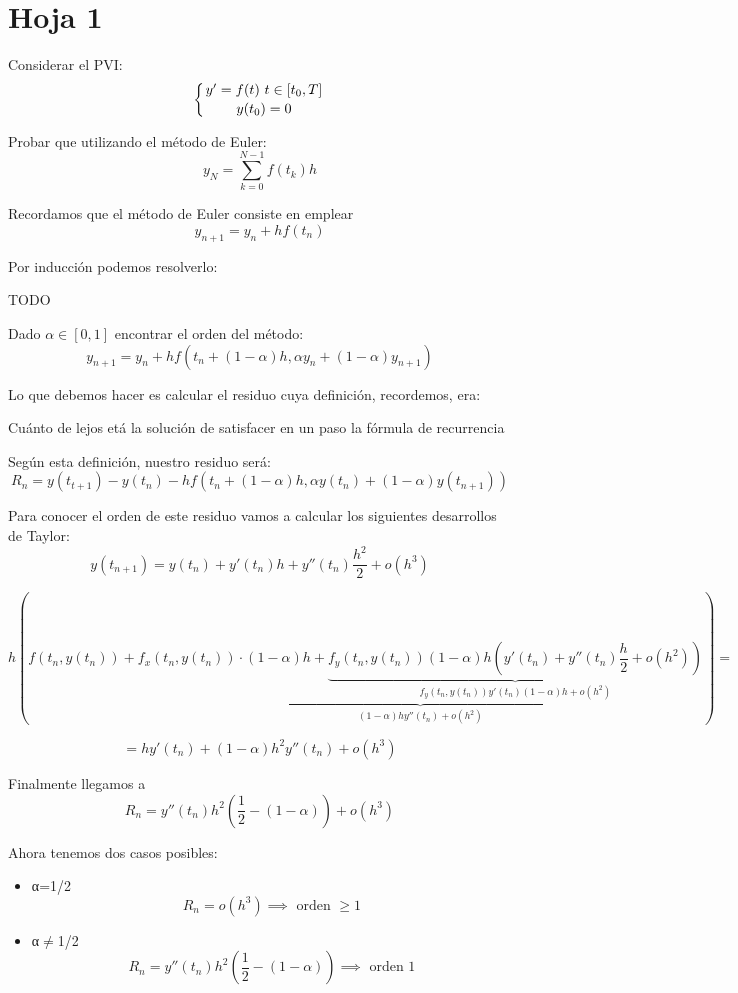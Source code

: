 \section{Hoja 1}
\begin{problem}[1]
Considerar el PVI:
\[\left\{ y'=f(t) \ t \in [t_0,T] \atop
y(t_0)=0
\right.\]

Probar que utilizando el método de Euler:
\[y_N=\sum_{k=0}^{N-1} f(t_k)h\]
\solution

Recordamos que el método de Euler consiste en emplear
\[y_{n+1} = y_n + h f(t_n)\]

Por inducción podemos resolverlo:

TODO
\end{problem}

\begin{problem}[5]
Dado $α \in [0,1]$ encontrar el orden del método:
\[y_{n+1} = y_n +hf(t_n+(1-α)h, αy_n+(1-α)y_{n+1})\]

\solution

Lo que debemos hacer es calcular el residuo cuya definición, recordemos, era:

\begin{defn}[Residuo]
Cuánto de lejos etá la solución de satisfacer en un paso la fórmula de recurrencia
\end{defn}

Según esta definición, nuestro residuo será:
\[R_n = y(t_{t+1}) - y(t_n) -hf(t_n+(1-α)h, αy(t_n)+(1-α)y(t_{n+1}))\]

Para conocer el orden de este residuo vamos a calcular los siguientes desarrollos de Taylor:
\[y(t_{n+1}) = y(t_n)+y'(t_n)h + y''(t_n)\frac{h^2}{2} + o(h^3)\]

\[h\left( f(t_n,y(t_n))+\underbrace{f_x(t_n,y(t_n))\cdot (1-α)h +\underbrace{f_y(t_n,y(t_n))(1-α)h\left( y'(t_n)+y''(t_n)\frac{h}{2}+o(h^2)\right)}_{f_y(t_n,y(t_n))y'(t_n)(1-α)h + o(h^2)}}_{(1-α)h y''(t_n) + o(h^2)}\right) = \]

\[=hy'(t_n)+(1-α)h^2y''(t_n)+o(h^3)\]

Finalmente llegamos a
\[R_n = y''(t_n)h^2 \left(\frac{1}{2}-(1-α) \right)+o(h^3)\]

Ahora tenemos dos casos posibles:
\begin{itemize}
\item α=1/2
\[R_n=o(h^3) \implies \text{ orden } \geq 1\]
\item α$\neq$1/2
\[R_n = y''(t_n)h^2 \left(\frac{1}{2}-(1-α) \right) \implies \text{ orden } 1\]
\end{itemize}

\end{problem}